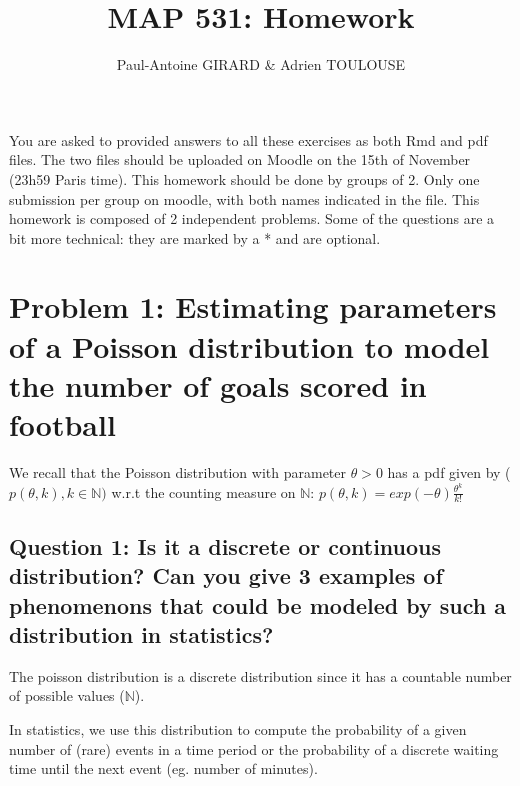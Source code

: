 \documentclass[]{article}
\title{MAP 531: Homework}
\author{Paul-Antoine GIRARD \& Adrien TOULOUSE}
\date{}
\begin{document}
\maketitle

You are asked to provided answers to all these exercises as both Rmd and
pdf files. The two files should be uploaded on Moodle on the 15th of
November (23h59 Paris time). This homework should be done by groups of
2. Only one submission per group on moodle, with both names indicated in
the file. This homework is composed of 2 independent problems. Some of
the questions are a bit more technical: they are marked by a * and are
optional.

\hypertarget{problem-1-estimating-parameters-of-a-poisson-distribution-to-model-the-number-of-goals-scored-in-football}{%
\section{Problem 1: Estimating parameters of a Poisson distribution to
model the number of goals scored in
football}\label{problem-1-estimating-parameters-of-a-poisson-distribution-to-model-the-number-of-goals-scored-in-football}}

We recall that the Poisson distribution with parameter \(\theta > 0\)
has a pdf given by (\(p(\theta, k), k \in \mathbb{N})\) w.r.t the
counting measure on \(\mathbb{N}\):
\(p(\theta, k) = exp(-\theta) \frac{\theta^k}{k!}\)

\hypertarget{question-1-is-it-a-discrete-or-continuous-distribution-can-you-give-3-examples-of-phenomenons-that-could-be-modeled-by-such-a-distribution-in-statistics}{%
\subsection{Question 1: Is it a discrete or continuous distribution? Can
you give 3 examples of phenomenons that could be modeled by such a
distribution in
statistics?}\label{question-1-is-it-a-discrete-or-continuous-distribution-can-you-give-3-examples-of-phenomenons-that-could-be-modeled-by-such-a-distribution-in-statistics}}

The poisson distribution is a discrete distribution since it has a
countable number of possible values (\(\mathbb{N}\)).

In statistics, we use this distribution to compute the probability of a
given number of (rare) events in a time period or the probability of a
discrete waiting time until the next event (eg. number of minutes).
\end{document}
